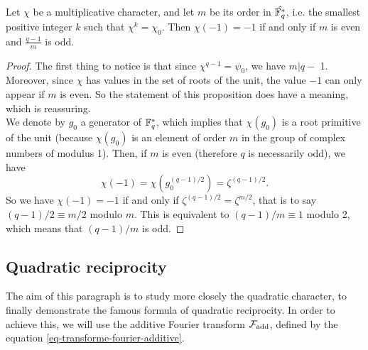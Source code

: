 \begin{prop}
\label{prop-calcul-psi-1}
Let $ \chi $ be a multiplicative character, and let $ m $ be its order in $ \hat{\mathbb{F}_q^*} $, i.e. the smallest positive integer $ k $ such that $ \chi^k = \chi_0 $. Then $ \chi (-1) = - 1 $ if and only if $ m $ is even and $ \frac{q-1}{m} $ is odd.
\end{prop}
\begin{proof}
The first thing to notice is that since $ \chi^{q-1} = \psi_0 $, we have $ m | q-$ 1. Moreover, since $ \chi $ has values in the set of  roots of the unit, the value $ -1 $ can only appear if $ m $ is even. So the statement of this proposition does have a meaning, which is reassuring. \\We denote by $ g_0 $ a generator of $ \mathbb{F}_q^* $, which implies that $ \chi (g_0) $ is a root  primitive of the unit (because $ \chi (g_0) $ is an element of order $ m $ in the group of complex numbers of modulus 1). Then, if $ m $ is even (therefore $ q $ is necessarily odd), we have
\begin{equation*}
\chi (-1) = \chi \left(g_0^{(q-1) / 2} \right) = \zeta^{(q-1) / 2}.
\end{equation*}
So we have $ \chi (-1) = - 1 $ if and only if $ \zeta^{(q-1) / 2} = \zeta^{m / 2} $, that is to say $ (q-1) / 2 \equiv m / 2 $ modulo $ m $. This is equivalent to $ (q-1) / m \equiv 1 $ modulo 2, which means that $ (q-1) / m $ is odd.
\end{proof}
 
\subsection{Quadratic reciprocity}
 
 
 The aim of this paragraph is to study more closely the quadratic character, to finally demonstrate the famous formula of quadratic reciprocity. In order to achieve this, we will use the additive Fourier transform $ \mathcal{F}_{\text{add}} $, defined by the equation \eqref{eq-transforme-fourier-additive}.
 
